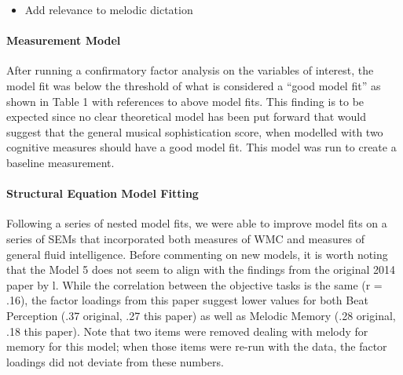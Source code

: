\documentclass[]{book}
\providecommand{\tightlist}{%
  \setlength{\itemsep}{0pt}\setlength{\parskip}{0pt}}
\let\oldparagraph\paragraph
\renewcommand{\paragraph}[1]{\oldparagraph{#1}\mbox{}}
\begin{document}
\begin{itemize}
\tightlist
\item
  Add relevance to melodic dictation
\end{itemize}

\hypertarget{measurement-model-1}{%
\paragraph{Measurement Model}\label{measurement-model-1}}

After running a confirmatory factor analysis on the variables of interest, the model fit was below the threshold of what is considered a ``good model fit'' as shown in Table 1 with references to above model fits.
This finding is to be expected since no clear theoretical model has been put forward that would suggest that the general musical sophistication score, when modelled with two cognitive measures should have a good model fit.
This model was run to create a baseline measurement.

\hypertarget{structural-equation-model-fitting}{%
\paragraph{Structural Equation Model Fitting}\label{structural-equation-model-fitting}}

Following a series of nested model fits, we were able to improve model fits on a series of SEMs that incorporated both measures of WMC and measures of general fluid intelligence.
Before commenting on new models, it is worth noting that the Model 5 does not seem to align with the findings from the original 2014 paper by \citep{mullensiefenMusicalityNonMusiciansIndex2014}l.
While the correlation between the objective tasks is the same (r = .16), the factor loadings from this paper suggest lower values for both Beat Perception (.37 original, .27 this paper) as well as Melodic Memory (.28 original, .18 this paper).
Note that two items were removed dealing with melody for memory for this model; when those items were re-run with the data, the factor
loadings did not deviate from these numbers.
\end{document}
